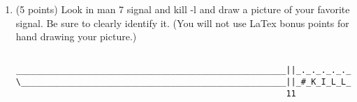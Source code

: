 \documentclass{article}[9pt]
\newenvironment{myanswer}{\begin{mdframed}\begin{answerfont}}{\end{answerfont}\end{mdframed}}
\begin{document}
\begin{enumerate}
\item (5 points) Look in man 7 signal and kill -l and draw a
picture of your favorite signal. Be sure to clearly identify
it. (You will not use LaTex bonus points for hand drawing your
picture.)
\begin{myanswer}
\begin{verbatim}

______________________________________________________||_._._._._._._._.
\_____________________________________________________||_#_K_I_L_L_9_#_|
                                                      11

\end{verbatim}
\end{myanswer}

\end{enumerate}
\end{document}
